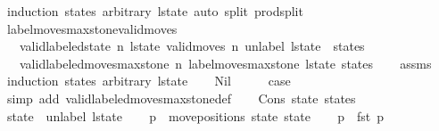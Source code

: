 \begin{isabellebody}
%
\isatagproof
{}\isamarkupfalse%
\ {\isacharparenleft}induction\ states\ arbitrary{\isacharcolon}\ l{\isacharunderscore}state{\isacharparenright}\ {\isacharparenleft}auto\ split{\isacharcolon}\ prod{\isachardot}split{\isacharparenright}%
\endisatagproof
{\isafoldproof}%
%
\isadelimproof
\isanewline
%
\endisadelimproof
\isanewline
{}\isamarkupfalse%
\ label{\isacharunderscore}moves{\isacharunderscore}max{\isacharunderscore}stone{\isacharunderscore}valid{\isacharunderscore}moves{\isacharcolon}\isanewline
\ \ \ {\isachardoublequoteopen}valid{\isacharunderscore}labeled{\isacharunderscore}state\ n\ l{\isacharunderscore}state{\isachardoublequoteclose}\ {\isachardoublequoteopen}valid{\isacharunderscore}moves\ n\ {\isacharparenleft}unlabel\ l{\isacharunderscore}state\ {\isacharhash}\ states{\isacharparenright}{\isachardoublequoteclose}\isanewline
\ \ \ {\isachardoublequoteopen}valid{\isacharunderscore}labeled{\isacharunderscore}moves{\isacharunderscore}max{\isacharunderscore}stone\ n\ {\isacharparenleft}label{\isacharunderscore}moves{\isacharunderscore}max{\isacharunderscore}stone\ l{\isacharunderscore}state\ states{\isacharparenright}{\isachardoublequoteclose}\isanewline
%
\isadelimproof
\ \ %
\endisadelimproof
%
\isatagproof
{}\isamarkupfalse%
\ assms\isanewline
{}\isamarkupfalse%
\ {\isacharparenleft}induction\ states\ arbitrary{\isacharcolon}\ l{\isacharunderscore}state{\isacharparenright}\isanewline
\ \ \isamarkupfalse%
\ Nil\isanewline
\ \ \isamarkupfalse%
\ \isamarkupfalse%
\ {\isacharquery}case\isanewline
\ \ \ \ \isamarkupfalse%
\ {\isacharparenleft}simp\ add{\isacharcolon}\ valid{\isacharunderscore}labeled{\isacharunderscore}moves{\isacharunderscore}max{\isacharunderscore}stone{\isacharunderscore}def{\isacharparenright}\isanewline
{}\isamarkupfalse%
\isanewline
\ \ \isamarkupfalse%
\ {\isacharparenleft}Cons\ state{\isacharprime}\ states{\isacharparenright}\isanewline
\ \ \isamarkupfalse%
\ {\isacharquery}state\ {\isacharequal}\ {\isachardoublequoteopen}unlabel\ l{\isacharunderscore}state{\isachardoublequoteclose}\isanewline
\ \ \isamarkupfalse%
\ {\isacharquery}p\ {\isacharequal}\ {\isachardoublequoteopen}move{\isacharunderscore}positions\ {\isacharquery}state\ state{\isacharprime}{\isachardoublequoteclose}\isanewline
\ \ \isamarkupfalse%
\ {\isacharquery}p{}\ {\isacharequal}\ {\isachardoublequoteopen}fst\ {\isacharquery}p{\isachardoublequoteclose}\isanewline

\end{isabellebody}
